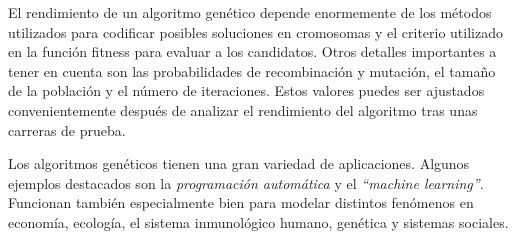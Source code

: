 El rendimiento de un algoritmo genético depende enormemente de los métodos utilizados para codificar posibles soluciones en cromosomas y el criterio utilizado en la función fitness para evaluar a los candidatos.
Otros detalles importantes a tener en cuenta son las probabilidades de recombinación y mutación, el tamaño de la población y el número de iteraciones. Estos valores puedes ser ajustados convenientemente después
de analizar el rendimiento del algoritmo tras unas carreras de prueba.

Los algoritmos genéticos tienen una gran variedad de aplicaciones. Algunos ejemplos destacados son la \textit{programación automática} y el \textit{``machine learning''}. Funcionan también especialmente bien para
modelar distintos fenómenos en economía, ecología, el sistema inmunológico humano, genética y sistemas sociales.
